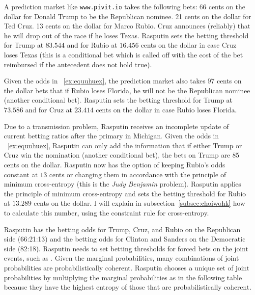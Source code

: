 \documentclass[phd,12pt,oneside]{ubcthesis}
\begin{document}
\begin{quotex}
  \label{ex:equuhuex} A
  prediction market like \texttt{www.pivit.io} takes the following
  bets: 66 cents on the dollar for Donald Trump to be the Republican
  nominee. 21 cents on the dollar for Ted Cruz. 13 cents on the dollar
  for Marco Rubio. Cruz announces (reliably) that he will drop out of
  the race if he loses Texas. Rasputin sets the betting threshold for
  Trump at $83.544$ and for Rubio at $16.456$ cents on the dollar in
  case Cruz loses Texas (this is a conditional bet which is called off
  with the cost of the bet reimbursed if the antecedent does not hold
  true).
\end{quotex}

\begin{quotex}
  \label{ex:poonahva}
  Given the odds in {\xample}~\ref{ex:equuhuex}, the prediction market
  also takes 97 cents on the dollar bets that if Rubio loses Florida,
  he will not be the Republican nominee (another conditional bet).
  Rasputin sets the betting threshold for Trump at $73.586$ and for
  Cruz at $23.414$ cents on the dollar in case Rubio loses Florida.
\end{quotex}

\begin{quotex}
  \label{ex:eikaetai} Due
  to a transmission problem, Rasputin receives an incomplete update of
  current betting ratios after the primary in Michigan. Given the odds
  in {\xample}~\ref{ex:equuhuex}, Rasputin can only add the
  information that if either Trump or Cruz win the nomination (another
  conditional bet), the bets on Trump are 85 cents on the dollar.
  Rasputin now has the option of keeping Rubio's odds constant at $13$
  cents or changing them in accordance with the principle of minimum
  cross-entropy (this is the \emph{Judy Benjamin} problem). Rasputin applies
  the principle of minimum cross-entropy and sets the betting
  threshold for Rubio at $13.289$ cents on the dollar. I will explain
  in subsection~\ref{subsec:choiwohk} how to calculate this number,
  using the constraint rule for cross-entropy.
\end{quotex}

\begin{quotex}
  \label{ex:axothuir}
  Rasputin has the betting odds for Trump, Cruz, and Rubio on the
  Republican side (66:21:13) and the betting odds for Clinton and
  Sanders on the Democratic side (82:18). Rasputin needs to set
  betting thresholds for forced bets on the joint events, such as
  . Given the marginal probabilities, many
  combinations of joint probabilities are probabilistically coherent.
  Rasputin chooses a unique set of joint probabilities by multiplying
  the marginal probabilities as in the following table because they
  have the highest entropy of those that are probabilistically
  coherent.
\end{quotex}
\end{document}
